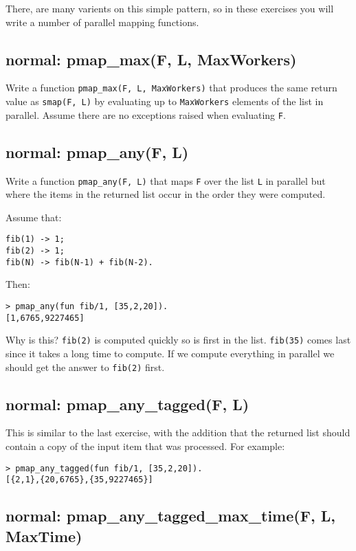 \documentclass[12pt]{hitec}
\begin{document}
There, are many varients on this simple pattern, so in these exercises
you will write a number of parallel mapping functions.

\subsection{normal: pmap\_max(F, L, MaxWorkers)}

Write a function \verb+pmap_max(F, L, MaxWorkers)+ that produces the same return
value as \verb+smap(F, L)+ by evaluating up to \verb+MaxWorkers+ elements of the list
in parallel. Assume there are no exceptions raised when evaluating \verb+F+.

\subsection{normal: pmap\_any(F, L)}

Write a function \verb+pmap_any(F, L)+ that maps \verb+F+ over the
list \verb+L+ in parallel but where the items in the returned list
occur in the order they were computed.

Assume that:

\begin{Verbatim}
fib(1) -> 1;
fib(2) -> 1; 
fib(N) -> fib(N-1) + fib(N-2).
\end{Verbatim}

Then:

\begin{Verbatim}
> pmap_any(fun fib/1, [35,2,20]).
[1,6765,9227465]
\end{Verbatim}

Why is this? \verb+fib(2)+ is computed quickly so is first in the
list.  \verb+fib(35)+ comes last since it takes a long time to
compute. If we compute everything in parallel we should get the answer
to \verb+fib(2)+ first.

\subsection{normal: pmap\_any\_tagged(F, L)}

This is similar to the last exercise, with the addition that the returned
list should contain a copy of the input item that was processed. For example:

\begin{Verbatim}
> pmap_any_tagged(fun fib/1, [35,2,20]).
[{2,1},{20,6765},{35,9227465}]
\end{Verbatim}

\subsection{normal: pmap\_any\_tagged\_max\_time(F, L, MaxTime)}
\end{document}

